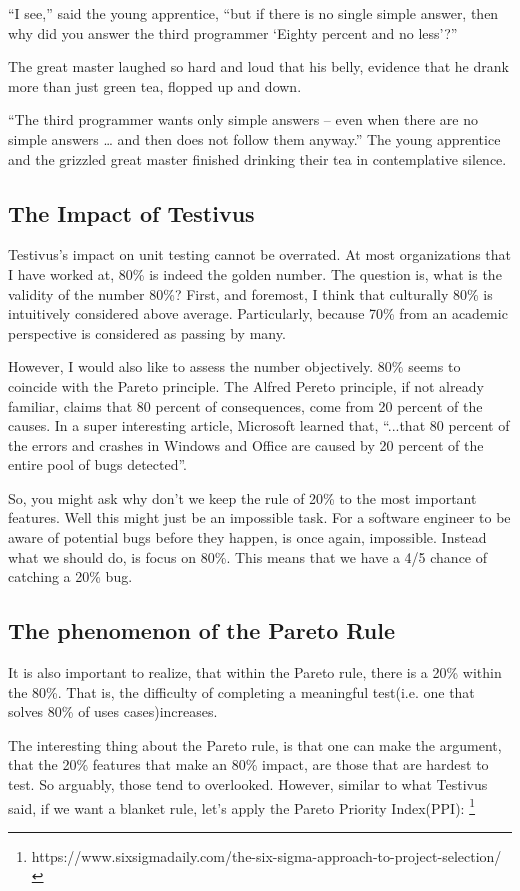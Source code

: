 {“I see,” said the young apprentice, “but if there is no single simple answer,
then why did you answer the third programmer ‘Eighty percent and no less’?”

The great master laughed so hard and loud that his belly, evidence that he
drank more than just green tea, flopped up and down.

“The third programmer wants only simple answers – even when there are no simple
answers … and then does not follow them anyway.” The young apprentice and the
grizzled great master finished drinking their tea in contemplative silence.
}

\subsection{The Impact of Testivus}
Testivus's impact on unit testing cannot be overrated. At most organizations
that I have worked at, 80\% is indeed the golden number. The question is, what
is the validity of the number 80\%? First, and foremost, I think that culturally
80\% is intuitively considered above average. Particularly, because 70\% from an
academic perspective is considered as passing by many.

However, I would also like to assess the number objectively. 80\% seems to
coincide with the Pareto principle. The Alfred Pereto principle, if not already
familiar, claims that 80 percent of consequences, come from 20 percent of the
causes. In a super interesting article, Microsoft learned that, ``...that 80
percent of the errors and crashes in Windows and Office are caused by 20 percent
of the entire pool of bugs detected''.

So, you might ask why don't we keep the rule of 20\% to the most important
features. Well this might just be an impossible task. For a software engineer
to be aware of potential bugs before they happen, is once again, impossible.
Instead what we should do, is focus on 80\%. This means that we have a 4/5
chance of catching a 20\% bug.

\subsection{The phenomenon of the Pareto Rule}
It is also important to realize, that within the  Pareto rule, there is a 20\%
within the 80\%. That is, the difficulty of  completing a meaningful test(i.e.
one that solves 80\% of uses cases)increases.

The interesting thing about the Pareto rule, is that one can make the argument,
that the 20\% features that make an 80\% impact, are those that are hardest to
test. So arguably, those tend to overlooked. However, similar to what Testivus
said, if we want a blanket rule, let's apply the Pareto Priority Index(PPI):
\footnote{https://www.sixsigmadaily.com/the-six-sigma-approach-to-project-selection/}

